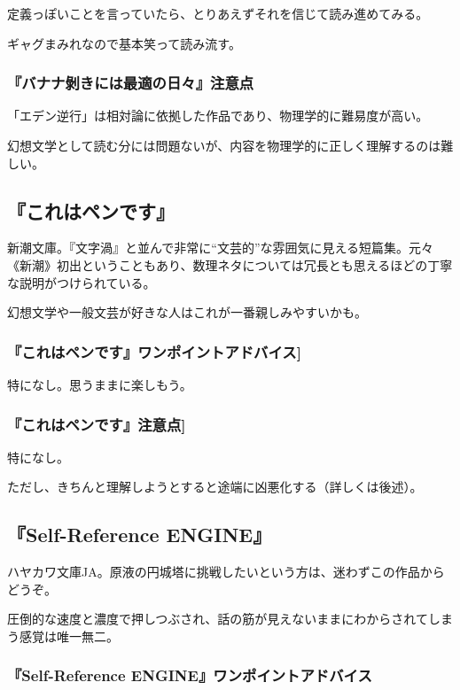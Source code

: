 \documentclass[10pt, a5paper, twoside]{jsarticle}
\begin{document}
				定義っぽいことを言っていたら、とりあえずそれを信じて読み進めてみる。

				ギャグまみれなので基本笑って読み流す。

			\subsubsection*{『バナナ剝きには最適の日々』注意点}

				「エデン逆行」は相対論に依拠した作品であり、物理学的に難易度が高い。

				幻想文学として読む分には問題ないが、内容を物理学的に正しく理解するのは難しい。

		\subsection{『これはペンです』}

			新潮文庫。『文字渦』と並んで非常に“文芸的”な雰囲気に見える短篇集。元々《新潮》初出ということもあり、数理ネタについては冗長とも思えるほどの丁寧な説明がつけられている。

			幻想文学や一般文芸が好きな人はこれが一番親しみやすいかも。

			\subsubsection*{『これはペンです』ワンポイントアドバイス]}

				特になし。思うままに楽しもう。

			\subsubsection*{『これはペンです』注意点]}

				特になし。

				ただし、きちんと理解しようとすると途端に凶悪化する（詳しくは後述）。

		\subsection{『Self-Reference ENGINE』}

				ハヤカワ文庫JA。原液の円城塔に挑戦したいという方は、迷わずこの作品からどうぞ。

				圧倒的な速度と濃度で押しつぶされ、話の筋が見えないままにわからされてしまう感覚は唯一無二。
			
			\subsubsection*{『Self-Reference ENGINE』ワンポイントアドバイス}
\end{document}
